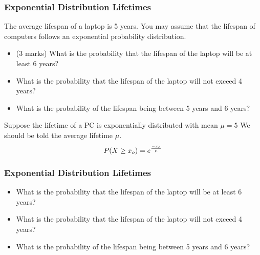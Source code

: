\begin{frame}
\frametitle{Exponential Distribution Lifetimes}
The average lifespan of a laptop is 5 years. You may assume that
the lifespan of computers follows an exponential probability
distribution. \begin{itemize}\item (3 marks) What is the
probability that the lifespan of the laptop will be at least 6
years? \item
What is the probability that the lifespan of the laptop will not
exceed 4 years? \item What is the probability of the
lifespan being between 5 years and 6 years?
\end{itemize}
Suppose the lifetime of a PC is exponentially distributed with
mean $\mu =5$
We should be told the average lifetime $\mu$.
\[
P( X \geq x_o) = e^{{-x_o \over \mu}}
\]
\end{frame}

\begin{frame}
	\frametitle{Exponential Distribution Lifetimes}

\begin{itemize}
\item What is the probability that the lifespan of the laptop will be at least
6 years?
\item What is the probability that the lifespan of the laptop will not exceed
4 years?
\item What is the probability of the lifespan being between 5 years and 6
years?
\end{itemize}

\end{frame}


